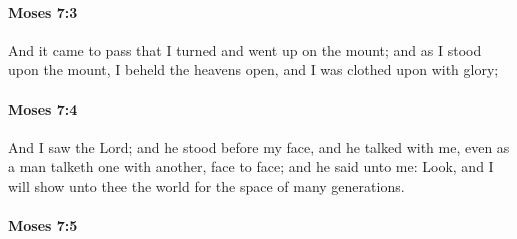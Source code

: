 
		\paragraph{Moses 7:3} %
			\label{MOSES-7-3}

			And it came to pass that I turned and went up on the mount; and as I stood upon the mount, I beheld the heavens open, and I was clothed upon with glory;


		\paragraph{Moses 7:4} %
			\label{MOSES-7-4}

			And I saw the Lord; and he stood before my face, and he talked with me, even as a man talketh one with another, face to face; and he said unto me: Look, and I will show unto thee the world for the space of many generations.


		\paragraph{Moses 7:5} %
			\label{MOSES-7-5}

